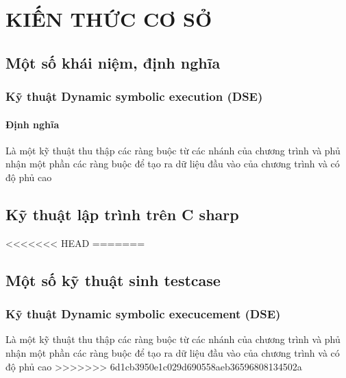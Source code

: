 \newpage
\chapter{KIẾN THỨC CƠ SỞ}

\section{Một số khái niệm, định nghĩa}
\subsection{Kỹ thuật Dynamic symbolic execution (DSE) }
\subsubsection{Định nghĩa}
Là một kỹ thuật thu thập các ràng buộc từ các nhánh của chương trình và phủ nhận một phần các ràng buộc để tạo ra dữ liệu đầu vào của chương trình và có độ phủ cao


\section{Kỹ thuật lập trình trên C sharp}

<<<<<<< HEAD
=======
\section{Một số kỹ thuật sinh testcase}

\subsection{Kỹ thuật Dynamic symbolic execucement (DSE) }

Là một kỹ thuật thu thập các ràng buộc từ các nhánh của chương trình
và phủ nhận một phần các ràng buộc để tạo ra dữ liệu đầu vào của
chương trình và có độ phủ cao
>>>>>>> 6d1cb3950e1c029d690558aeb36596808134502a

	

